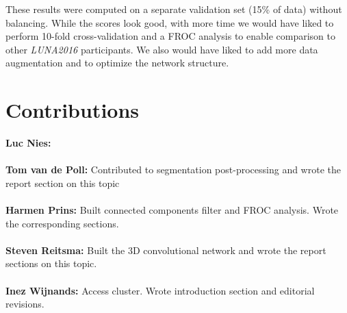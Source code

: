 \documentclass{article}
\begin{document}
%

These results were computed on a separate validation set (15\% of data) without balancing.
While the scores look good, with more time we would have liked to perform 10-fold cross-validation and a FROC analysis to enable comparison to other \textit{LUNA2016} participants.
We also would have liked to add more data augmentation and to optimize the network structure.

\appendix
\section{Contributions}
\textbf{Luc Nies:} \\
\\
\textbf{Tom van de Poll:} Contributed to segmentation post-processing and wrote the report section on this topic\\
\\
\textbf{Harmen Prins:} Built connected components filter and FROC analysis. Wrote the corresponding sections.\\
\\
\textbf{Steven Reitsma:} Built the 3D convolutional network and wrote the report sections on this topic.\\
\\
\textbf{Inez Wijnands:} Access cluster. Wrote introduction section and editorial revisions.


\end{document}
